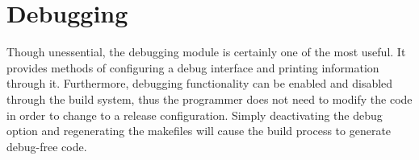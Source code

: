 \section{Debugging}

Though unessential, the debugging module is certainly one of the most useful.
It provides methods of configuring a debug interface and printing information
through it. Furthermore, debugging functionality can be enabled and disabled
through the build system, thus the programmer does not need to modify the code
in order to change to a release configuration. Simply deactivating the debug
option and regenerating the makefiles will cause the build process to generate
debug-free code.


